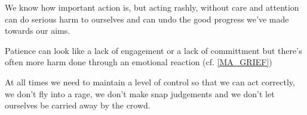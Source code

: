 \cleardoublepage
\begin{multicols}{2}

We know how important action is, but acting rashly, without care and attention can do serious harm to ourselves and can undo the good progress we've made towards our aims.

Patience can look like a lack of engagement or a lack of committment but there's often more harm done through an emotional reaction (cf. \ref{MA_GRIEF}) 

At all times we need to maintain a level of control so that we can act correctly, we don't fly into a rage, we don't make snap judgements and we don't let ourselves be carried away by the crowd.

\end{multicols}
\clearpage
